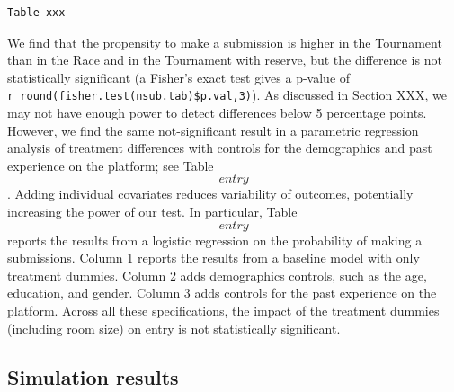 \documentclass[12pt,]{article}
\begin{document}
\begin{verbatim}
Table xxx
\end{verbatim}

We find that the propensity to make a submission is higher in the
Tournament than in the Race and in the Tournament with reserve, but the
difference is not statistically significant (a Fisher's exact test gives
a p-value of \texttt{r~round(fisher.test(nsub.tab)\$p.val,3)}). As
discussed in Section XXX, we may not have enough power to detect
differences below 5 percentage points. However, we find the same
not-significant result in a parametric regression analysis of treatment
differences with controls for the demographics and past experience on
the platform; see Table \[entry\]. Adding individual covariates reduces
variability of outcomes, potentially increasing the power of our test.
In particular, Table \[entry\] reports the results from a logistic
regression on the probability of making a submissions. Column 1 reports
the results from a baseline model with only treatment dummies. Column 2
adds demographics controls, such as the age, education, and gender.
Column 3 adds controls for the past experience on the platform. Across
all these specifications, the impact of the treatment dummies (including
room size) on entry is not statistically significant.

\subsection{Simulation results}\label{simulation-results-1}

\renewcommand\refname{References}

\end{document}
